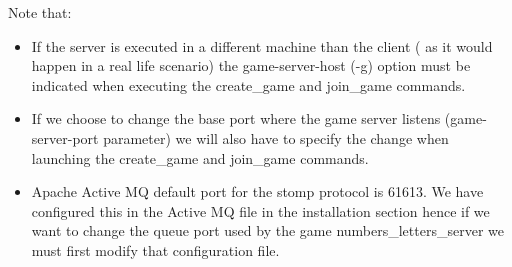 \documentclass[a4paper,10pt,titlepage]{article}
\begin{document}
\par Note that:
\begin{itemize}
	\item If the server is executed in a different machine than the client ( as it would happen in a real life scenario) the game-server-host (-g) option must be indicated when executing the create\_game and join\_game commands. 
	\item If we choose to change the base port where the game server listens (game-server-port parameter) we will also have to specify the change when launching the create\_game and join\_game commands.
	\item Apache Active MQ default port for the stomp protocol is 61613. We have configured this in the Active MQ file in the installation section hence if we want to change the queue port used by the game numbers\_letters\_server we must first modify that configuration file. 
\end{itemize} 
\end{document}
